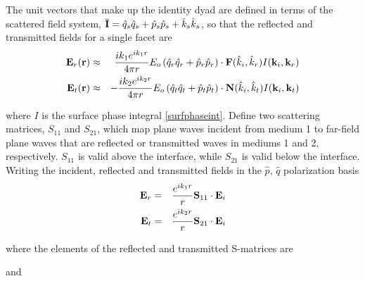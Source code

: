 The unit vectors that make up the identity dyad are defined in terms of the scattered field system, $\overline{\mathbf{I}} = \hat{q}_s \hat{q}_s+ \hat{p}_s \hat{p}_s +\hat{k}_s \hat{k}_s$, so that the reflected and transmitted fields for a single facet are 
\begin{eqnarray}
\mathbf{E}_r(\mathbf{r}) & \approx & \dfrac{ik_1e^{ik_1r}}{4\pi r} E_o \left( \hat{q}_r \hat{q}_r+ \hat{p}_r \hat{p}_r \right)  \cdot  \mathbf{F}(\hat{k}_i,\hat{k}_r)  I(\mathbf{k}_i,\mathbf{k}_r) \\
\mathbf{E}_t(\mathbf{r}) & \approx & -\dfrac{ik_2e^{ik_2r}}{4\pi r} E_o \left( \hat{q}_t \hat{q}_t+ \hat{p}_t \hat{p}_t \right)  \cdot  \mathbf{N}(\hat{k}_i,\hat{k}_t)  I(\mathbf{k}_i,\mathbf{k}_t) 
\end{eqnarray}


\noindent where $I$ is the surface phase integral \eqref{surfphaseint}. 
Define two scattering matrices, $S_{11}$ and $S_{21}$, which map plane waves incident from medium 1 to far-field plane waves that are reflected or transmitted waves in mediums 1 and 2, respectively. $S_{11}$ is valid above the interface, while $S_{21}$ is valid below the interface.  Writing the incident, reflected and transmitted fields in the $\hat{p}$, $\hat{q}$ polarization basis
\begin{eqnarray}
\mathbf{E}_r & = & \dfrac{e^{ik_1r}}{r} \mathbf{S}_{11}  \cdot \mathbf{E}_i  \\
\mathbf{E}_t & = & \dfrac{e^{ik_2r}}{r} \mathbf{S}_{21}  \cdot \mathbf{E}_i  
\end{eqnarray}

\noindent where the elements of the reflected and transmitted S-matrices are 

\noindent and
%

